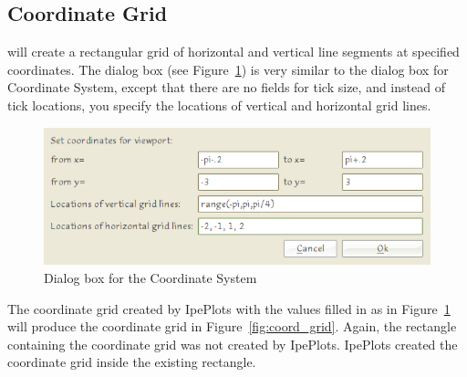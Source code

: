 \documentclass{article}
\begin{document}
\subsection{Coordinate Grid}
will create a rectangular grid of horizontal and vertical line segments at
specified coordinates. The dialog box (see Figure~\ref{fig:coord_grid_dialog}) is
very similar to the dialog box for Coordinate System, except that there are no
fields for tick size, and instead of tick locations, you specify the locations
of vertical and horizontal grid lines. 

\begin{figure}[h]
   \begin{center}
      \includegraphics[scale=3]{coord_grid_dialog.png}
   \end{center}
   \caption{Dialog box for the Coordinate System}
   \label{fig:coord_grid_dialog}
\end{figure}

The coordinate grid created by IpePlots with the values filled in as in
Figure~\ref{fig:coord_grid_dialog} will produce the coordinate grid in
Figure~\ref{fig:coord_grid}.  Again, the rectangle containing the coordinate
grid was not created by IpePlots.  IpePlots created the coordinate grid inside
the existing rectangle. 
\end{document}
